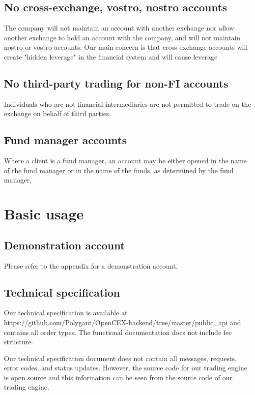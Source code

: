 \subsection{No cross-exchange, vostro, nostro accounts}
The company will not maintain an account with another exchange nor
allow another exchange to hold an account with the company, and will
not maintain nostro or vostro accounts.  Our main concern is that
cross exchange accounts will create "hidden leverage" in the
financial system and will cause leverage

\subsection{No third-party trading for non-FI accounts}
Individuals who are not financial intermediaries are not permitted to
trade on the exchange on behalf of third parties.

\subsection{Fund manager accounts}
Where a client is a fund manager, an account may be either opened in the name of
the fund manager or in the name of the funds, as determined by the
fund manager,

\section{Basic usage}
\subsection{Demonstration account}
Please refer to the appendix for a demonstration account.

\subsection{Technical specification}
Our technical specification is available at
https://github.com/Polygant/OpenCEX-backend/tree/master/public\_api
and contains all order types.  The functional documentation does not
include fee structure.

Our technical specification document does not contain all messages,
requests, error codes, and status updates.  However, the source code
for our trading engine is open source and this information can be seen
from the source code of our trading engine.

